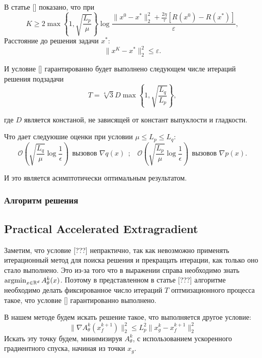 \documentclass[a4paper,12pt]{extarticle}
\newcommand{\argmin}{\mathop{\rm argmin}}
\newcommand{\norm}[1]{\|#1\|_{2}}
\newcommand{\sqn}[1]{\norm{#1}^2}
\begin{document}
В статье [] показано, что при 
	\begin{equation}\label{eq:K}
	\textstyle	K\geq 2\max \left\{1, \sqrt{\frac{L_p}{\mu}}\right\}\log \frac{\sqn{x^0 - x^*}
		+\frac{2\eta}{\tau}\left[R(x^0) - R(x^*)\right]}{\varepsilon},
	\end{equation}
	Расстояние до решения задачи $x^*$:
	\begin{equation}\label{eq:accuracy}
	\textstyle	\sqn{x^K - x^*} \leq \varepsilon.
	\end{equation}

И условие [] гарантированно будет выполнено следующем числе итераций решения подзадачи
\begin{equation}\label{eq:T}
    \textstyle T = \sqrt[4]{3}D\max\left\{1, \sqrt{\frac{L_q}{L_p}}\right\},
\end{equation}

где $D$ является констаной, не зависящей от констант выпуклости и гладкости.


Что дает следуюшие оценки при условии $\mu \leq L_p \leq L_q$:
    \begin{equation*}
    \textstyle \mathcal{O} \left(\sqrt{\frac{L_q}{\mu}}\log\frac{1}{\epsilon}\right) ~~ \text{вызовов}\,\, \nabla q(x)~~{\text{;} }\quad 
    \mathcal{O}  \left(\sqrt{\frac{L_p}{\mu}}\log\frac{1}{\epsilon}\right) ~~ \text{вызовов}\,\, \nabla p(x).
    \end{equation*}

И это является асимптотически оптимальным результатом.


\subsubsection{Алгоритм решения}

\subsection{Practical Accelerated Extragradient}
Заметим, что условие [???] непрактично, так как невозможно применять итерационный метод 
для поиска решения и прекращать итерации, как только оно стало выполнено. Это из-за того 
что в выражении справа необходимо знать $\argmin_{x \in \R^d} A_\theta^k(x)$. Поэтому 
в представленном в статье [???] алгоритме необходимо делать фиксированное число итераций $T$ 
оптмизационного процесса такое, что условие [] гарантированно выполнено. 

В нашем методе будем искать решение такое, что выполняется другое условие:
\[	\sqn{\nabla A_\theta^k(x_f^{k+1})} \leq  L_p^2 \sqn{x_g^k- x_f^{k+1}} \]
Искать эту точку будем, минимизируя $A_{\theta}^k$, с использованием ускоренного градиентного спуска,
начиная из точки $x_g$.
\end{document}
